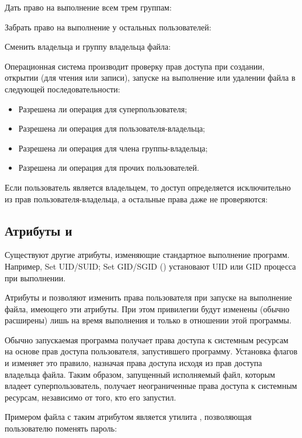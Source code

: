 Дать право на выполнение всем трем группам:


Забрать право на выполнение у остальных пользователей:


Сменить владельца и группу владельца файла:


Операционная система производит проверку прав доступа при создании, открытии (для чтения или записи), запуске на выполнение или удалении файла в следующей последовательности:
\begin{itemize}
	\item Разрешена ли операция для суперпользователя;
	\item Разрешена ли операция для пользователя-владельца;
	\item Разрешена ли операция для члена группы-владельца;
	\item Разрешена ли операция для прочих пользователей.
\end{itemize}

Если пользователь является владельцем, то доступ определяется исключительно из прав пользователя-владельца, а остальные права даже не проверяются:


\subsection{Атрибуты  и }

Существуют другие атрибуты, изменяющие стандартное выполнение программ. Например, Set UID/SUID; Set GID/SGID () установают UID или GID процесса при выполнении.

Атрибуты  и  позволяют изменить права пользователя при запуске на выполнение файла, имеющего эти атрибуты. При этом привилегии будут изменены (обычно расширены) лишь на время выполнения и только в отношении этой программы.

Обычно запускаемая программа получает права доступа к системным ресурсам на основе прав доступа пользователя, запустившего программу. Установка флагов  и  изменяет это правило, назначая права доступа исходя из прав доступа владельца файла. Таким образом, запущенный исполняемый файл, которым владеет суперпользователь, получает неограниченные права доступа к системным ресурсам, независимо от того, кто его запустил.

Примером файла с таким атрибутом является утилита , позволяющая пользователю поменять пароль:


